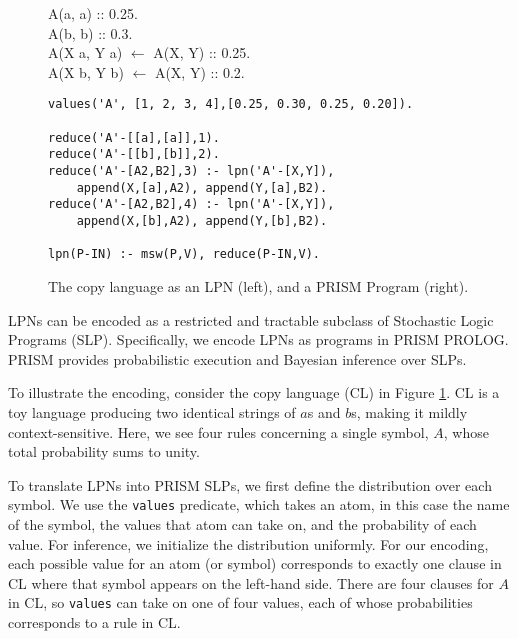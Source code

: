 \documentclass[11pt, twocolumn]{article}
\begin{document}

\begin{figure}[t]
	\centering
	\begin{minipage}[b]{0.45\textwidth}
A(a, a) :: 0.25. \\
A(b, b) :: 0.3. \\
A(X a, Y a) $\leftarrow$ A(X, Y) :: 0.25. \\
A(X b, Y b) $\leftarrow$ A(X, Y) :: 0.2.\\
		\label{fig:grammar}
	\end{minipage}
	\hfill
	\begin{minipage}[b]{0.5\textwidth}
		\begin{lstlisting}
values('A', [1, 2, 3, 4],[0.25, 0.30, 0.25, 0.20]).

reduce('A'-[[a],[a]],1).
reduce('A'-[[b],[b]],2).
reduce('A'-[A2,B2],3) :- lpn('A'-[X,Y]),
    append(X,[a],A2), append(Y,[a],B2).
reduce('A'-[A2,B2],4) :- lpn('A'-[X,Y]),
    append(X,[b],A2), append(Y,[b],B2).

lpn(P-IN) :- msw(P,V), reduce(P-IN,V).
		\end{lstlisting}
		\label{fig:prism}
	\end{minipage}
	\caption{The copy language as an LPN (left), and a PRISM Program (right).}
	\label{fig:copy}
\end{figure}

LPNs can be encoded as a restricted and tractable subclass of Stochastic Logic Programs (SLP). Specifically, we encode LPNs as programs in PRISM PROLOG. PRISM provides probabilistic execution and Bayesian inference over SLPs.

To illustrate the encoding, consider the copy language (CL) in Figure \ref{fig:copy}. CL is a toy language producing two identical strings of $a$s and $b$s, making it mildly context-sensitive. Here, we see four rules concerning a single symbol, $A$, whose total probability sums to unity.

To translate LPNs into PRISM SLPs, we first define the distribution over each symbol. We use the {\tt values} predicate, which takes an atom, in this case the name of the symbol, the values that atom can take on, and the probability of each value. For inference, we initialize the distribution uniformly. For our encoding, each possible value for an atom (or symbol) corresponds to exactly one clause in CL where that symbol appears on the left-hand side. There are four clauses for $A$ in CL, so {\tt values} can take on one of four values, each of whose probabilities corresponds to a rule in CL.
\end{document}
